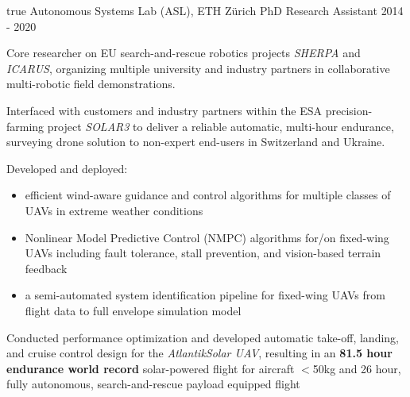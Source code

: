 \begin{cventries}
{    } %
    {} %
    {true}
    {}
%
\cvexpentry
  	{Autonomous Systems Lab (ASL), ETH Z\"{u}rich} %
  	{PhD Research Assistant} %
    {} %
    {2014 - 2020} %
    {
      \begin{cvitems} %
      	\item Core researcher on EU search-and-rescue robotics projects \emph{SHERPA} and \emph{ICARUS}, organizing multiple university and industry partners in collaborative multi-robotic field demonstrations. 
		\item Interfaced with customers and industry partners within the ESA precision-farming project \emph{SOLAR3} to deliver a reliable automatic, multi-hour endurance, surveying drone solution to non-expert end-users in Switzerland and Ukraine.      	
      	\item Developed and deployed:
      	\begin{itemize}
      		\item efficient wind-aware guidance and control algorithms for multiple classes of UAVs in extreme weather conditions
      		\item Nonlinear Model Predictive Control (NMPC) algorithms for/on fixed-wing UAVs including fault tolerance, stall prevention, and vision-based terrain feedback
      		\item a semi-automated system identification pipeline for fixed-wing UAVs from flight data to full envelope simulation model
      	\end{itemize}
      	\item Conducted performance optimization and developed automatic take-off, landing, and cruise control design for the \emph{AtlantikSolar UAV}, resulting in an \textbf{81.5 hour endurance world record} solar-powered flight for aircraft $<$50kg  and 26 hour, fully autonomous, search-and-rescue payload equipped flight 
      \end{cvitems}
    } %

\end{cventries}
